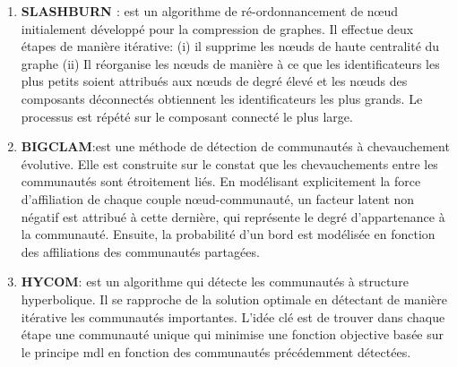 \begin{enumerate}[label=\alph*]
				\item \textbf{SLASHBURN \citep{kang2011beyond}}: est un algorithme de ré-ordonnancement de nœud initialement développé pour la compression de graphes. Il effectue deux étapes de manière itérative: (i) il supprime les nœuds de haute centralité du graphe (ii) Il réorganise les nœuds de manière à ce que les identificateurs les plus petits soient attribués aux nœuds de degré élevé et les nœuds des composants déconnectés obtiennent les identificateurs les plus grands. Le processus est répété sur le composant connecté le plus large.
				\item \textbf{BIGCLAM\citep{yang2013overlapping}}:est une méthode de détection de communautés à chevauchement évolutive. Elle est construite sur le constat que les chevauchements entre les communautés sont étroitement liés. En modélisant explicitement la force d’affiliation de chaque couple nœud-communauté, un facteur latent non négatif est attribué à cette dernière, qui représente le degré d'appartenance à la communauté. Ensuite, la probabilité d'un bord est modélisée en fonction des affiliations des communautés partagées.
				\item \textbf{HYCOM\citep{araujo2014beyond}}: est un algorithme qui détecte les communautés à structure hyperbolique. Il se rapproche de la solution optimale en détectant de manière itérative les communautés importantes. L'idée clé est de trouver dans chaque étape une communauté unique qui minimise une fonction objective basée sur le principe \gls{mdl} en fonction des communautés précédemment détectées. 
				
			\end{enumerate}
			
